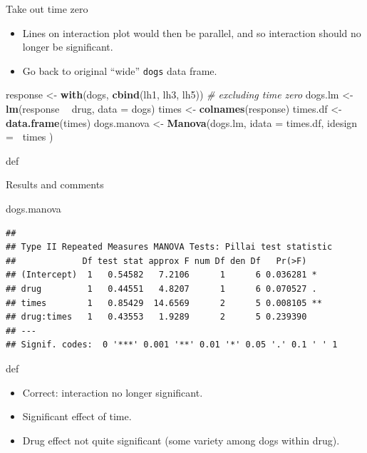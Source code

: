 \documentclass[ignorenonframetext,]{beamer}
\newenvironment{Shaded}{\begin{snugshade}}{\end{snugshade}}
\newcommand{\CommentTok}[1]{\textcolor[rgb]{0.56,0.35,0.01}{\textit{#1}}}
\newcommand{\DataTypeTok}[1]{\textcolor[rgb]{0.13,0.29,0.53}{#1}}
\newcommand{\KeywordTok}[1]{\textcolor[rgb]{0.13,0.29,0.53}{\textbf{#1}}}
\newcommand{\NormalTok}[1]{#1}
\newcommand{\OperatorTok}[1]{\textcolor[rgb]{0.81,0.36,0.00}{\textbf{#1}}}
\newcommand{\StringTok}[1]{\textcolor[rgb]{0.31,0.60,0.02}{#1}}
\begin{document}
\begin{frame}[fragile]{Take out time zero}
\protect\hypertarget{take-out-time-zero}{}

\begin{itemize}
\item
  Lines on interaction plot would then be parallel, and so interaction
  should no longer be significant.
\item
  Go back to original ``wide'' \texttt{dogs} data frame.
\end{itemize}

\begin{Shaded}
\begin{Highlighting}[]
\NormalTok{response <-}\StringTok{ }\KeywordTok{with}\NormalTok{(dogs, }\KeywordTok{cbind}\NormalTok{(lh1, lh3, lh5)) }\CommentTok{# excluding time zero}
\NormalTok{dogs.lm <-}\StringTok{ }\KeywordTok{lm}\NormalTok{(response }\OperatorTok{~}\StringTok{ }\NormalTok{drug, }\DataTypeTok{data =}\NormalTok{ dogs)}
\NormalTok{times <-}\StringTok{ }\KeywordTok{colnames}\NormalTok{(response)}
\NormalTok{times.df <-}\StringTok{ }\KeywordTok{data.frame}\NormalTok{(times)}
\NormalTok{dogs.manova <-}\StringTok{ }\KeywordTok{Manova}\NormalTok{(dogs.lm,}
  \DataTypeTok{idata =}\NormalTok{ times.df,}
  \DataTypeTok{idesign =} \OperatorTok{~}\NormalTok{times}
\NormalTok{)}
\end{Highlighting}
\end{Shaded}

def

\end{frame}

\begin{frame}[fragile]{Results and comments}
\protect\hypertarget{results-and-comments}{}

\begin{Shaded}
\begin{Highlighting}[]
\NormalTok{dogs.manova}
\end{Highlighting}
\end{Shaded}

\begin{verbatim}
## 
## Type II Repeated Measures MANOVA Tests: Pillai test statistic
##             Df test stat approx F num Df den Df   Pr(>F)   
## (Intercept)  1   0.54582   7.2106      1      6 0.036281 * 
## drug         1   0.44551   4.8207      1      6 0.070527 . 
## times        1   0.85429  14.6569      2      5 0.008105 **
## drug:times   1   0.43553   1.9289      2      5 0.239390   
## ---
## Signif. codes:  0 '***' 0.001 '**' 0.01 '*' 0.05 '.' 0.1 ' ' 1
\end{verbatim}

def

\begin{itemize}
\item
  Correct: interaction no longer significant.
\item
  Significant effect of time.
\item
  Drug effect not quite significant (some variety among dogs within
  drug).
\end{itemize}

\end{frame}
\end{document}
